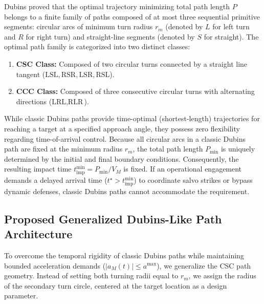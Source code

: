 Dubins proved that the optimal trajectory minimizing total path length $P$ belongs to a finite family of paths composed of at most three sequential primitive segments: circular arcs of minimum turn radius $r_m$ (denoted by $L$ for left turn and $R$ for right turn) and straight-line segments (denoted by $S$ for straight). The optimal path family is categorized into two distinct classes:
\begin{enumerate}
    \item \textbf{CSC Class:} Composed of two circular turns connected by a straight line tangent ($\text{LSL}, \text{RSR}, \text{LSR}, \text{RSL}$).
    \item \textbf{CCC Class:} Composed of three consecutive circular turns with alternating directions ($\text{LRL}, \text{RLR}$).
\end{enumerate}

While classic Dubins paths provide time-optimal (shortest-length) trajectories for reaching a target at a specified approach angle, they possess zero flexibility regarding time-of-arrival control. Because all circular arcs in a classic Dubins path are fixed at the minimum radius $r_m$, the total path length $P_{\text{min}}$ is uniquely determined by the initial and final boundary conditions. Consequently, the resulting impact time $t_{\text{imp}}^{\text{min}} = P_{\text{min}} / V_M$ is fixed. If an operational engagement demands a delayed arrival time ($t^{\star} > t_{\text{imp}}^{\text{min}}$) to coordinate salvo strikes or bypass dynamic defenses, classic Dubins paths cannot accommodate the requirement.
\subsection{Proposed Generalized Dubins-Like Path Architecture}\label{subsec:ch_DP_proposed_dubins_concept}

To overcome the temporal rigidity of classic Dubins paths while maintaining bounded acceleration demands ($|a_M(t)| \le a^{\max}$), we generalize the CSC path geometry. Instead of setting both turning radii equal to $r_m$, we assign the radius of the secondary turn circle, centered at the target location as a design parameter.


